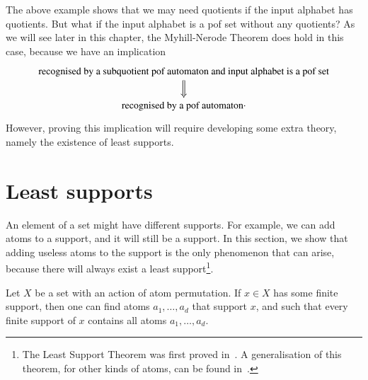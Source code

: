 The above example shows that we may need quotients if the input alphabet has quotients. But what if the input alphabet  is a pof set without any quotients?   As we will see later in this chapter, the Myhill-Nerode Theorem does hold in this case, because we have an implication 
\[
\begin{tikzcd}
\txt{recognised by a subquotient pof automaton  and input alphabet is a pof set}  \ar[d,Rightarrow] \\ \txt{recognised by a pof automaton}.
\end{tikzcd}
\]
However, proving this implication will require developing some extra theory, namely the existence of least supports. 

\exercisepart


\section{Least supports}
\label{sec:least-support}
An element of a set might have different supports. For example, we can add atoms to a support, and it will still be a support. In this section, we show that adding useless atoms to the support is the only phenomenon that can arise, because there will always exist a least support\footnote{The Least Support Theorem was first proved in~\cite[Proposition 3.4]{DBLP:journals/fac/GabbayP02}. A generalisation of this theorem, for other kinds of atoms, can be found in~\cite[Section 10]{DBLP:journals/corr/BojanczykKL14}.}. 

\begin{theorem} \label{thm:least-supports} Let $X$ be a set with an action of atom permutation. If $x \in X$ has some finite support, then one can find   atoms  $a_1,\ldots,a_d$ that support $x$, and such that every finite support of $x$ contains all atoms $a_1,\ldots,a_d$.
\end{theorem}

